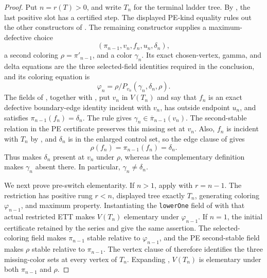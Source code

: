 \begin{proof}
Put $n=r(T)>0$, and write $T_n$ for the terminal ladder tree.  By
, the last positive slot has a certified step.
The displayed PE-kind equality rules out the other constructors of
.  The remaining constructor supplies a
maximum-defective choice
\[
 (\pi_{n-1},v_n,f_n,u_n,\delta_n),
\]
a second coloring $\rho=\pi'_{n-1}$, and a color $\gamma_n$.  Its exact
chosen-vertex, gamma, and delta equations are the three selected-field
identities required in the conclusion, and its coloring equation is
\[
 \varphi_n=\rho/P_{v_n}(\gamma_n,\delta_n,\rho).                 \tag{1}
\]
The fields of , together with
, put $v_n$ in $V(T_n)$ and say that $f_n$ is an
exact defective boundary-edge identity incident with $v_n$, has outside
endpoint $u_n$, and satisfies $\pi_{n-1}(f_n)=\delta_n$.  The rule
 gives
$\gamma_n\in\overline\pi_{n-1}(v_n)$.  The second-stable relation in the
PE certificate preserves this missing set at $v_n$.  Also, $f_n$ is
incident with $T_n$ by , and $\delta_n$ is in
the enlarged control set, so the edge clause of
 gives
\[
 \rho(f_n)=\pi_{n-1}(f_n)=\delta_n.                             \tag{2}
\]
Thus  makes $\delta_n$ present at $v_n$ under
$\rho$, whereas the complementary definition 
makes $\gamma_n$ absent there.  In particular,
$\gamma_n\ne\delta_n$.

We next prove pre-switch elementarity.  If $n>1$, apply
 with $r=n-1$.  The restriction has
positive rung $r<n$, displayed tree exactly $T_n$, generating coloring
$\varphi_{n-1}$, and maximum property.  Instantiating the
\texttt{lowerOne} field of  with that
actual restricted ETT makes $V(T_n)$ elementary under
$\varphi_{n-1}$.  If $n=1$, the initial certificate retained by the
series and  give the same assertion.  The
selected-coloring field makes $\pi_{n-1}$ stable relative to
$\varphi_{n-1}$, and the PE second-stable field makes $\rho$ stable
relative to $\pi_{n-1}$.  The vertex clause of
 therefore identifies the three missing-color
sets at every vertex of $T_n$.  Expanding
, $V(T_n)$ is elementary under both
$\pi_{n-1}$ and $\rho$.


\end{proof}
